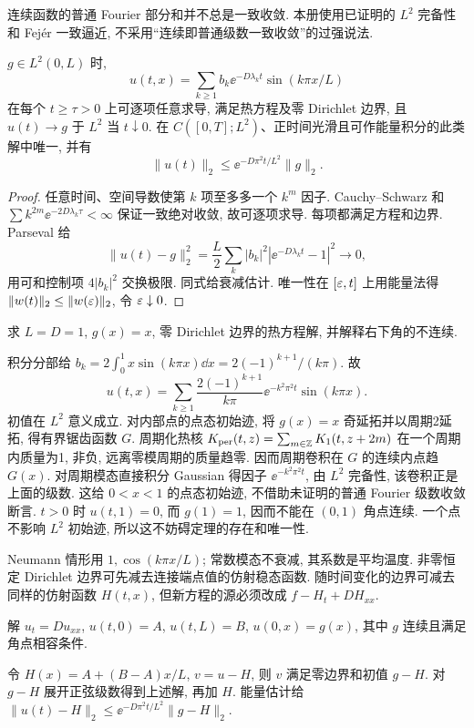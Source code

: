 连续函数的普通 Fourier 部分和并不总是一致收敛. 本册使用已证明的 $L^2$ 完备性和 Fejér 一致逼近, 不采用“连续即普通级数一致收敛”的过强说法.
\begin{theorem}\label{thm:intervalheat}
$g\in L^2(0,L)$ 时,
\[
u(t,x)=\sum_{k\ge1}b_k\ee^{-D\lambda_kt}\sin(k\pi x/L)
\]
在每个 $t\ge\tau>0$ 上可逐项任意求导, 满足热方程及零 Dirichlet 边界, 且 $u(t)\to g$ 于 $L^2$ 当 $t\downarrow0$. 在 $C([0,T];L^2)$、正时间光滑且可作能量积分的此类解中唯一, 并有
\[
\|u(t)\|_2\le\ee^{-D\pi^2t/L^2}\|g\|_2.
\]
\end{theorem}
\begin{proof}
任意时间、空间导数使第 $k$ 项至多多一个 $k^m$ 因子. Cauchy--Schwarz 和 $\sum k^{2m}\ee^{-2D\lambda_k\tau}<\infty$ 保证一致绝对收敛, 故可逐项求导. 每项都满足方程和边界. Parseval 给
\[
\|u(t)-g\|_2^2=\frac L2\sum_k|b_k|^2|\ee^{-D\lambda_kt}-1|^2\longrightarrow0,
\]
用可和控制项 $4|b_k|^2$ 交换极限. 同式给衰减估计. 唯一性在 $[\varepsilon,t]$ 上用能量法得 $\|w(t)\|_2\le\|w(\varepsilon)\|_2$, 令 $\varepsilon\downarrow0$.
\end{proof}
\begin{example}\label{ex:rodx}
求 $L=D=1$, $g(x)=x$, 零 Dirichlet 边界的热方程解, 并解释右下角的不连续.
\end{example}
\begin{solution}
积分分部给 $b_k=2\int_0^1x\sin(k\pi x)\dd x=2(-1)^{k+1}/(k\pi)$. 故
\[
u(t,x)=\sum_{k\ge1}\frac{2(-1)^{k+1}}{k\pi}\ee^{-k^2\pi^2t}\sin(k\pi x).
\]
初值在 $L^2$ 意义成立. 对内部点的点态初始迹, 将 $g(x)=x$ 奇延拓并以周期2延拓, 得有界锯齿函数 $G$. 周期化热核 $K_{\rm per}(t,z)=\sum_{m\in\mathbb Z}K_1(t,z+2m)$ 在一个周期内质量为1, 非负, 远离零模周期的质量趋零. 因而周期卷积在 $G$ 的连续内点趋 $G(x)$. 对周期模态直接积分 Gaussian 得因子 $\ee^{-k^2\pi^2t}$, 由 $L^2$ 完备性, 该卷积正是上面的级数. 这给 $0<x<1$ 的点态初始迹, 不借助未证明的普通 Fourier 级数收敛断言. $t>0$ 时 $u(t,1)=0$, 而 $g(1)=1$, 因而不能在 $(0,1)$ 角点连续. 一个点不影响 $L^2$ 初始迹, 所以这不妨碍定理的存在和唯一性.
\end{solution}
Neumann 情形用 $1,\cos(k\pi x/L)$; 常数模态不衰减, 其系数是平均温度. 非零恒定 Dirichlet 边界可先减去连接端点值的仿射稳态函数. 随时间变化的边界可减去同样的仿射函数 $H(t,x)$, 但新方程的源必须改成 $f-H_t+D H_{xx}$.
\begin{exercise}
解 $u_t=Du_{xx}$, $u(t,0)=A$, $u(t,L)=B$, $u(0,x)=g(x)$, 其中 $g$ 连续且满足角点相容条件.
\end{exercise}
\begin{solution}
令 $H(x)=A+(B-A)x/L$, $v=u-H$, 则 $v$ 满足零边界和初值 $g-H$. 对 $g-H$ 展开正弦级数得到上述解, 再加 $H$. 能量估计给 $\|u(t)-H\|_2\le\ee^{-D\pi^2t/L^2}\|g-H\|_2$.
\end{solution}
